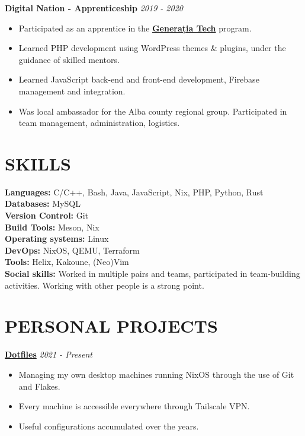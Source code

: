 \documentclass[margin]{res}
\begin{document}
\begin{resume}
  {\bf Digital Nation - Apprenticeship} \hfill \textit{2019 - 2020}\\
  \begin{itemize}
    \item Participated as an apprentice in the \href{https://generatiatech.ro}{\textbf{Generația Tech}} program.
    \item Learned PHP development using WordPress themes \& plugins, under the guidance of skilled mentors.
    \item Learned JavaScript back-end and front-end development, Firebase management and integration.
    \item Was local ambassador for the Alba county regional group. Participated in team management, administration, logistics.
  \end{itemize}

  \section{SKILLS}
  {\bf Languages:} C/C++, Bash, Java, JavaScript, Nix, PHP, Python, Rust\\
  {\bf Databases:} MySQL\\
  {\bf Version Control:} Git\\
  {\bf Build Tools:} Meson, Nix\\
  {\bf Operating systems:} Linux\\
  {\bf DevOps:} NixOS, QEMU, Terraform\\
  {\bf Tools:} Helix, Kakoune, (Neo)Vim\\

  {\bf Social skills:} Worked in multiple pairs and teams, participated in team-building activities. Working with other people is a strong point.

  \section{PERSONAL PROJECTS}

  {\bf \href{https://github.com/fufexan/dotfiles}{Dotfiles}} \hfill \textit{2021 - Present}\\
  \begin{itemize}
    \item Managing my own desktop machines running NixOS through the use of Git and Flakes.
    \item Every machine is accessible everywhere through Tailscale VPN.
    \item Useful configurations accumulated over the years.
  \end{itemize}



\end{resume}
\end{document}
